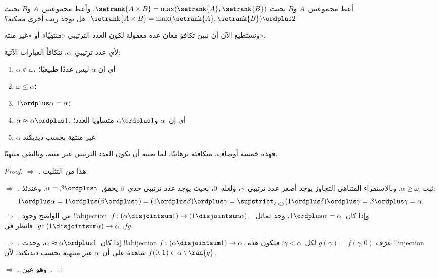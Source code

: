 \documentclass[../../../include/open-logic-section]{subfiles}
\begin{document}
\begin{prob}
أعط مجموعتين~$A$ و$B$ بحيث
$\setrank{A \times B} =
\max(\setrank{A}, \setrank{B})$. وأعط مجموعتين~$A$ و$B$ بحيث
$\setrank{A \times B} =
\max(\setrank{A}, \setrank{B}) \ordplus 2$. هل توجد رتب أخرى ممكنة؟
\end{prob}

ونستطيع الآن أن نبين تكافؤ معان عدة معقولة لكون العدد الترتيبي
«منتهيًا» أو «غير منته».

\begin{lem}
لأي عدد ترتيبي~$\alpha$، تتكافأ العبارات الآتية:
\begin{enumerate}
	\item{} $\alpha\notin \omega$، أي إن
	$\alpha$ ليس عددًا طبيعيًا؛
	\item{} $\omega \leq \alpha$؛
	\item{} $1 \ordplus \alpha = \alpha$؛
	\item{} $\alpha \approx \alpha\ordplus 1$، أي
	إن~$\alpha$ و$\alpha\ordplus 1$ متساويا العدد؛
	\item{} $\alpha$ غير منتهة بحسب ديديكند.
	\end{enumerate}
\end{lem}
\noindent
فهذه خمسة أوصاف، متكافئة برهانيًا، لما يعنيه أن يكون العدد الترتيبي
غير منته، وبالنفي منتهيًا.

\begin{proof}
\emph{ $\Rightarrow$ .}
هذا من التثليث.

\emph{ $\Rightarrow$ .}
ثبت~$\alpha \geq \omega$. وبالاستقراء المتناهي التجاوز يوجد أصغر
عدد ترتيبي~$\gamma$، ولعله~$0$، بحيث يوجد عدد ترتيبي حدي~$\beta$
يحقق~$\alpha = \beta \ordplus \gamma$. وعندئذ:
\[
	1 \ordplus \alpha =
	1 \ordplus (\beta \ordplus \gamma) =
	(1 \ordplus \beta) \ordplus \gamma =
	\supstrict_{\delta < \beta} (1 \ordplus \delta) \ordplus \gamma =
	\beta \ordplus \gamma =
	\alpha.
\]
\emph{ $\Rightarrow$ .} من
الواضح وجود !!a{bijection}~$f \colon (\alpha \disjointsum 1) \to (1
\disjointsum \alpha)$. وإذا كان~$1 \ordplus \alpha = \alpha$، وجد
تماثل~$g \colon (1 \disjointsum \alpha) \to \alpha$. فانظر في
$\comp{f}{g}$.

\emph{ $\Rightarrow$ .} إذا
كان~$\alpha \approx \alpha \ordplus 1$، وجدت !!a{bijection}
$f \colon (\alpha \disjointsum 1) \to \alpha$. عرّف
$g(\gamma) = f(\gamma, 0)$ لكل~$\gamma < \alpha$؛ فتكون هذه
!!{injection} شاهدة على أن~$\alpha$ غير منتهية بحسب ديديكند، لأن
$f(0,1) \in \alpha \setminus \ran{g}$.

\emph{ $\Rightarrow$ .}
وهو عين~.
\end{proof}
\end{document}
